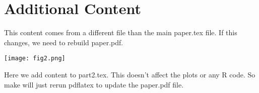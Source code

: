 
\section{Additional Content}

This content comes from a different file
than the main paper.tex file.
If this changes, we need to rebuild paper.pdf.

\texttt{[image: fig2.png]}


Here we add content to part2.tex.
This doesn't affect the plots or any R code.
So make will just rerun pdflatex to update the paper.pdf file.


